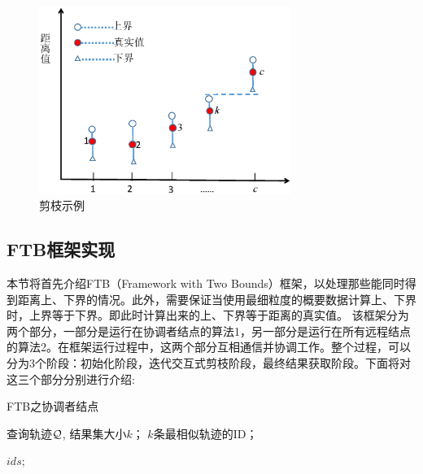\begin{figure}
	\centering
	\includegraphics[width=0.73\textwidth]{Fig/chapter3/Bound}
	\caption{剪枝示例}
	\label{fig-chapter3-Bound}
\end{figure}



\subsection{FTB框架实现}
本节将首先介绍FTB（Framework with Two Bounds）框架，以处理那些能同时得到距离上、下界的情况。此外，需要保证当使用最细粒度的概要数据计算上、下界时，上界等于下界。即此时计算出来的上、下界等于距离的真实值。
该框架分为两个部分，一部分是运行在协调者结点的算法1，另一部分是运行在所有远程结点的算法2。在框架运行过程中，这两个部分互相通信并协调工作。整个过程，可以分为3个阶段：初始化阶段，迭代交互式剪枝阶段，最终结果获取阶段。下面将对这三个部分分别进行介绍:

\begin{algorithm}[t]
	\caption{FTB之协调者结点}
	\label{alg:frame1-coordinator}
	\begin{algorithmic}[1]
		\REQUIRE 查询轨迹${\cal Q}$, 结果集大小$k$；
		\ENSURE $k$条最相似轨迹的ID；
		
				\label{a1:info}
				\ENDIF
		\ENDWHILE
		\RETURN $ids$; \label{a1:finalreturn}
	\end{algorithmic}
\end{algorithm}


